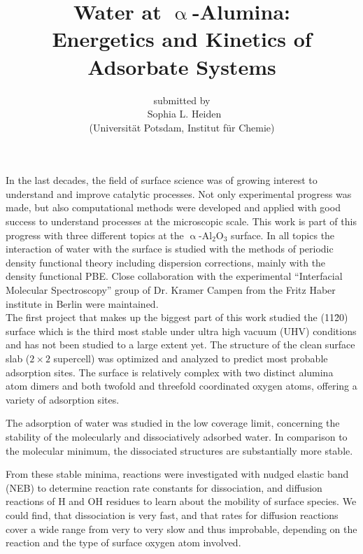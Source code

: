 \documentclass[11pt,DIV=13,a4paper,headinclude]{scrartcl}
\begin{document}
\titlehead{\centering\normalfont\large\scshape Scientific Abstract}
\title{\Large\vspace{-\baselineskip} Water at $\upalpha$-Alumina:\\
  Energetics and Kinetics of Adsorbate Systems\vspace{0\baselineskip}}
\author{\large\sffamily submitted by\\
  \Large\textbf\sffamily\ Sophia L. Heiden\\
  \large\sffamily (Universit\"{a}t Potsdam, Institut f\"{u}r Chemie)}
\date{}

\maketitle

In the last decades, the field of surface science was of growing interest to understand and improve catalytic processes.
Not only experimental progress was made, but also computational methods were developed and applied with good success to understand processes at the microscopic scale.
This work is part of this progress with three different topics at the $\upalpha$-Al$_2$O$_3$ surface.
In all topics the interaction of water with the surface is studied with the methods of periodic density functional theory including dispersion corrections, mainly with the density functional PBE.
Close collaboration with the experimental ``Interfacial Molecular Spectroscopy'' group of Dr. Kramer Campen from the Fritz Haber institute in Berlin were maintained.
\\


The first project that makes up the biggest part of this work studied the (11\=20) surface which is the third most stable under ultra high vacuum (UHV) conditions and has not been studied to a large extent yet.
The structure of the clean surface slab ($2\times 2$ supercell) was optimized and analyzed to predict most probable adsorption sites.
The surface is relatively complex with two distinct alumina atom dimers and both twofold and threefold coordinated oxygen atoms, offering a variety of adsorption sites.

The adsorption of water was studied in the low coverage limit, concerning the stability of the molecularly and dissociatively adsorbed water.
In comparison to the molecular minimum, the dissociated structures are substantially more stable.

From these stable minima, reactions were investigated with nudged elastic band (NEB) to determine reaction rate constants for dissociation, and diffusion reactions of H and OH residues to learn about the mobility of surface species.
We could find, that dissociation is very fast, and that rates for diffusion reactions cover a wide range from very to very slow and thus improbable, depending on the reaction and the type of surface oxygen atom involved. 
\end{document}
